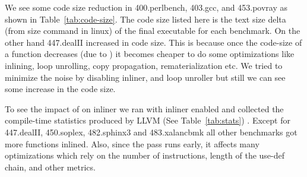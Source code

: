 \documentclass[sigplan,10pt,review,anonymous]{acmart}\settopmatter{printfolios=true,printccs=false,printacmref=false}
\begin{document}
We see some code size reduction in 400.perlbench, 403.gcc, and 453.povray as
shown in Table~\ref{tab:code-size}.  The code size listed here is the text size
delta (from size command in linux) of the final executable for each benchmark.  On
the other hand 447.dealII increased in code size. This is because once the
code-size of a function decreases (due to \GCM{}) it becomes cheaper to do some
optimizations like inlining, loop unrolling, copy propagation, rematerialization
etc. We tried to minimize the noise by disabling inliner, and loop unroller but
still we can see some increase in the code size.

To see the impact of \GCM{} on inliner we ran \GCM{} with inliner enabled and
collected the compile-time statistics produced by LLVM (See
Table~\ref{tab:stats}) . Except for 447.dealII, 450.soplex, 482.sphinx3 and
483.xalancbmk all other benchmarks got more functions inlined. Also, since the
pass runs early, it affects many optimizations which rely on the number of
instructions, length of the use-def chain, and other metrics.
\end{document}
